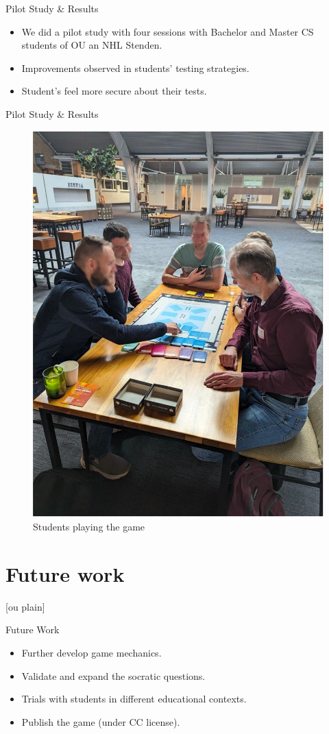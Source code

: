 \documentclass[aspectratio=169]{beamer}
\begin{document}
\begin{frame}{Pilot Study \& Results}
    \begin{itemize}
        \item We did a pilot study with four sessions with Bachelor and Master CS students of OU an NHL Stenden.
        \item Improvements observed in students' testing strategies.
        \item Student's feel more secure about their tests.
    \end{itemize}
\end{frame}

\begin{frame}{Pilot Study \& Results}
    \begin{figure}
        \centering
        \includegraphics[width=0.4\linewidth]{images//Imagen1.jpg}
        \caption{Students playing the game}
    \end{figure}
\end{frame}

\section{Future work}

[ou plain]
\begin{frame}{Future Work}
    \begin{itemize}
        \item Further develop game mechanics.
        \item Validate and expand the socratic questions.
        \item Trials with students in different educational contexts.
        \item Publish the game (under CC license).
    \end{itemize}
\end{frame}
\end{document}
